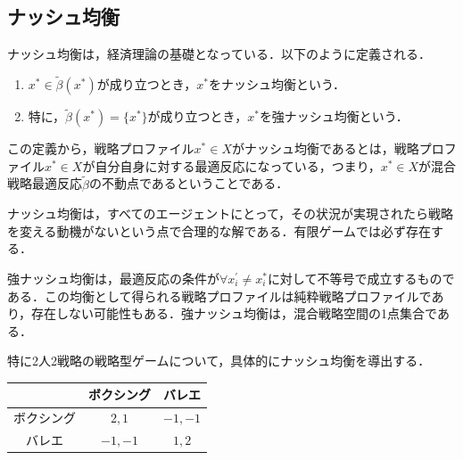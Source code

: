 \documentclass{jsreport}
\begin{document}
\subsection{ナッシュ均衡}
ナッシュ均衡は，経済理論の基礎となっている．以下のように定義される．
\begin{screen}
  \begin{defi}[ナッシュ均衡]
    \begin{enumerate}
      \item $x^{*} \in \tilde{\beta}(x^{*})$が成り立つとき，$x^{*}$をナッシュ均衡という．
      \item 特に，$\tilde{\beta}(x^{*}) = \{x^{*}\}$が成り立つとき，$x^{*}$を強ナッシュ均衡という．
    \end{enumerate}
  \end{defi}
\end{screen}

この定義から，戦略プロファイル$x^{*} \in X$がナッシュ均衡であるとは，戦略プロファイル$x^{*} \in X$が自分自身に対する最適反応になっている，つまり，$x^{*} \in X$が混合戦略最適反応$\tilde{\beta}$の不動点であるということである．

ナッシュ均衡は，すべてのエージェントにとって，その状況が実現されたら戦略を変える動機がないという点で合理的な解である．有限ゲームでは必ず存在する．

強ナッシュ均衡は，最適反応の条件が$\forall x_i^{\prime} \neq x_i^{*}$に対して不等号で成立するものである．この均衡として得られる戦略プロファイルは純粋戦略プロファイルであり，存在しない可能性もある．強ナッシュ均衡は，混合戦略空間の1点集合である．

特に2人2戦略の戦略型ゲームについて，具体的にナッシュ均衡を導出する．

\begin{table}[H]
\centering
  \begin{tabular}{c|c|c}
        & ボクシング & バレエ  \\ \hline
    ボクシング & $2, 1$ & $-1, -1$ \\ \hline
    バレエ & $-1, -1$ & $1, 2$ \\
  \end{tabular}
\end{table}
\end{document}
